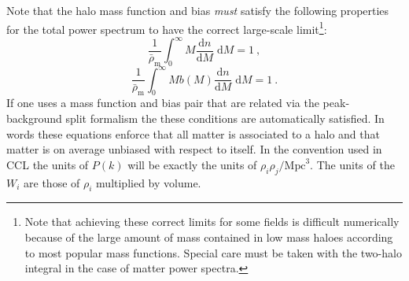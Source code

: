 \documentclass[\docopts]{\docclass}
\begin{document}
Note that the halo mass function and bias \emph{must} satisfy the following properties for the total power spectrum to have the correct large-scale limit\footnote{Note that achieving these correct limits for some fields is difficult numerically because of the large amount of mass contained in low mass haloes according to most popular mass functions. Special care must be taken with the two-halo integral in the case of matter power spectra.}:
\begin{equation}
\frac{1}{\bar\rho_\mathrm{m}}\int_0^\infty M\frac{\mathrm{d}n}{\mathrm{d}M}\;\mathrm{d}M=1\ ,
\label{eq:mf_normalisation}
\end{equation}
\begin{equation}
\frac{1}{\bar\rho_\mathrm{m}}\int_0^\infty Mb(M)\frac{\mathrm{d}n}{\mathrm{d}M}\;\mathrm{d}M=1\ .
\label{eq:bias_normalisation}
\end{equation}
If one uses a mass function and bias pair that are related via the peak-background split formalism \citep{Mo1996,Sheth2001} the these conditions are automatically satisfied. In words these equations enforce that all matter is associated to a halo and that matter is on average unbiased with respect to itself. In the convention used in CCL the units of $P(k)$ will be exactly the units of $\rho_i\rho_j / \mathrm{Mpc}^3$. The units of the $W_i$ are those of $\rho_i$ multiplied by volume.
\end{document}
